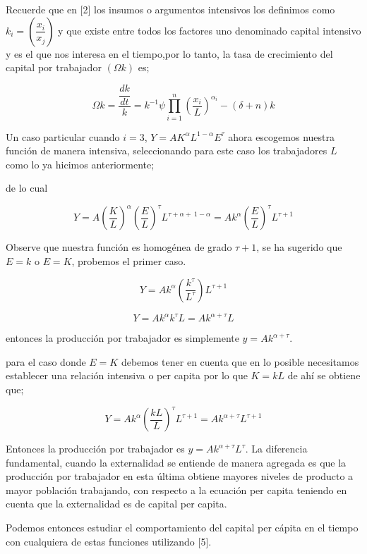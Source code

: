 \documentclass[12pt]{article}
\begin{document}
Recuerde que en [2] los insumos o argumentos intensivos los definimos como $k_{i}= \left( \dfrac {x_{i}}{x_{j}} \right)$ y que  existe entre todos los factores uno denominado capital intensivo y es el que nos interesa en el tiempo,por lo tanto, la tasa de crecimiento del capital por trabajador $(\Omega k)$ es; 

$$  \Omega k=\dfrac{\dfrac{dk}{dt}}{k}=  k ^ {- 1 } \psi \prod_{i=1}^{n}\left(\dfrac{x_i}{L}\right)^{\alpha_i} -(\delta + n)k $$



Un caso particular cuando $i=3$, $ Y=AK^{\alpha}L^{1-\alpha}E^\tau$ ahora escogemos nuestra función de manera intensiva, seleccionando para este caso los trabajadores $L$ como lo ya hicimos anteriormente;

de lo cual 

$$Y=A\left(\dfrac{K}{L}\right)^{\alpha}\left(\dfrac{E}{L}\right)^{\tau}L^{\tau + \alpha + \ 1- \alpha}=Ak^\alpha \left(\dfrac{E}{L}\right)^{\tau} L^{\tau + 1}$$

Observe que nuestra función es homogénea de grado $\tau + 1 $, se ha sugerido que $E=k$ o $E=K$, probemos el primer caso.



$$Y=Ak^{\alpha}\left(\dfrac{k^{\tau}}{L^{\tau}} \right) L^{\tau +1}$$

$$ Y= Ak^{\alpha}k^{\tau}L = Ak^{\alpha + \tau}L$$

entonces la producción por trabajador es simplemente $y=Ak^{\alpha + \tau}$.


para el caso donde $E=K$ debemos tener en cuenta que en lo posible necesitamos establecer una relación intensiva o per capita por lo que $K=kL$ de ahí se obtiene que;

$$Y=Ak^{\alpha}\left(\dfrac{kL}{L}\right)^{\tau}L^{\tau + 1} = Ak^{\alpha + \tau } L^{\tau +1 }$$

Entonces la producción por trabajador es $y= Ak^{\alpha + \tau }L^{ \tau}$. La diferencia fundamental, cuando la externalidad se entiende de manera agregada  es que la producción por trabajador en esta última   obtiene mayores niveles de producto a mayor población trabajando, con respecto a la ecuación per capita teniendo en cuenta que la externalidad es de capital per capita. 



Podemos entonces estudiar el comportamiento del capital per cápita en el tiempo  con cualquiera  de estas funciones utilizando [5].
\end{document}
